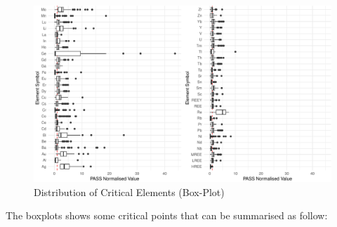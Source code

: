 \documentclass[11pt,a4paper,]{article}
\begin{document}
\begin{figure}

{\centering \includegraphics[width=1\linewidth]{Final_report_files/figure-latex/element-dist-1} 

}

\caption{Distribution of Critical Elements (Box-Plot)}\label{fig:element-dist}
\end{figure}

The boxplots shows some critical points that can be summarised as follow:
\end{document}
